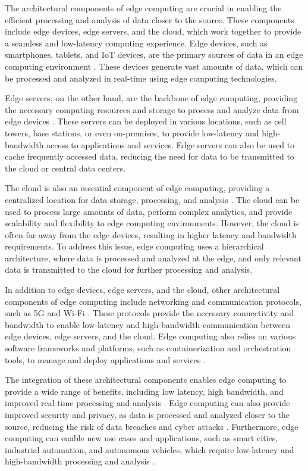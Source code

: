 \documentclass[11pt]{article}
\begin{document}
The architectural components of edge computing are crucial in enabling the efficient processing and analysis of data closer to the source. These components include edge devices, edge servers, and the cloud, which work together to provide a seamless and low-latency computing experience. Edge devices, such as smartphones, tablets, and IoT devices, are the primary sources of data in an edge computing environment \cite{ref1}. These devices generate vast amounts of data, which can be processed and analyzed in real-time using edge computing technologies.

Edge servers, on the other hand, are the backbone of edge computing, providing the necessary computing resources and storage to process and analyze data from edge devices \cite{ref17}. These servers can be deployed in various locations, such as cell towers, base stations, or even on-premises, to provide low-latency and high-bandwidth access to applications and services. Edge servers can also be used to cache frequently accessed data, reducing the need for data to be transmitted to the cloud or central data centers.

The cloud is also an essential component of edge computing, providing a centralized location for data storage, processing, and analysis \cite{ref18}. The cloud can be used to process large amounts of data, perform complex analytics, and provide scalability and flexibility to edge computing environments. However, the cloud is often far away from the edge devices, resulting in higher latency and bandwidth requirements. To address this issue, edge computing uses a hierarchical architecture, where data is processed and analyzed at the edge, and only relevant data is transmitted to the cloud for further processing and analysis.

In addition to edge devices, edge servers, and the cloud, other architectural components of edge computing include networking and communication protocols, such as 5G and Wi-Fi \cite{ref4}. These protocols provide the necessary connectivity and bandwidth to enable low-latency and high-bandwidth communication between edge devices, edge servers, and the cloud. Edge computing also relies on various software frameworks and platforms, such as containerization and orchestration tools, to manage and deploy applications and services \cite{ref19}.

The integration of these architectural components enables edge computing to provide a wide range of benefits, including low latency, high bandwidth, and improved real-time processing and analysis \cite{ref20}. Edge computing can also provide improved security and privacy, as data is processed and analyzed closer to the source, reducing the risk of data breaches and cyber attacks \cite{ref5}. Furthermore, edge computing can enable new use cases and applications, such as smart cities, industrial automation, and autonomous vehicles, which require low-latency and high-bandwidth processing and analysis \cite{ref21}.
\end{document}
